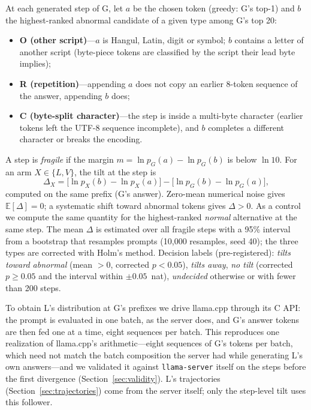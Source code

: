 \documentclass[11pt]{article}
\begin{document}
At each generated step of G, let $a$ be the chosen token (greedy: G's top-1) and $b$ the highest-ranked abnormal candidate
of a given type among G's top 20:
\begin{itemize}
\item \textbf{O (other script)}---$a$ is Hangul, Latin, digit or symbol; $b$ contains a letter of another script
      (byte-piece tokens are classified by the script their lead byte implies);
\item \textbf{R (repetition)}---appending $a$ does not copy an earlier 8-token sequence of the answer, appending $b$ does;
\item \textbf{C (byte-split character)}---the step is inside a multi-byte character (earlier tokens left the UTF-8 sequence
      incomplete), and $b$ completes a different character or breaks the encoding.
\end{itemize}
A step is \emph{fragile} if the margin $m = \ln p_G(a) - \ln p_G(b)$ is below $\ln 10$. For an arm $X\in\{L,V\}$, the tilt
at the step is
\begin{equation}\label{eq:tilt}
  \Delta_X = \bigl[\ln p_X(b) - \ln p_X(a)\bigr] - \bigl[\ln p_G(b) - \ln p_G(a)\bigr],
\end{equation}
computed on the same prefix (G's answer). Zero-mean numerical noise gives $\mathbb{E}[\Delta]=0$; a systematic shift toward
abnormal tokens gives $\Delta>0$. As a control we compute the same quantity for the highest-ranked \emph{normal} alternative
at the same step. The mean $\Delta$ is estimated over all fragile steps with a 95\% interval from a bootstrap that resamples
prompts (10,000 resamples, seed 40); the three types are corrected with Holm's method. Decision labels (pre-registered):
\emph{tilts toward abnormal} (mean $>0$, corrected $p<0.05$), \emph{tilts away}, \emph{no tilt} (corrected $p\ge 0.05$ and
the interval within $\pm0.05$~nat), \emph{undecided} otherwise or with fewer than 200 steps.

To obtain L's distribution at G's prefixes we drive llama.cpp through its C API: the prompt is evaluated in one batch, as the
server does, and G's answer tokens are then fed one at a time, eight sequences per batch. This reproduces one realization of
llama.cpp's arithmetic---eight sequences of G's tokens per batch, which need not match the batch composition the server had
while generating L's own answers---and we validated it against \texttt{llama-server} itself on the steps before the first
divergence (Section~\ref{sec:validity}). L's trajectories (Section~\ref{sec:trajectories}) come from the server itself; only
the step-level tilt uses this follower.
\end{document}
